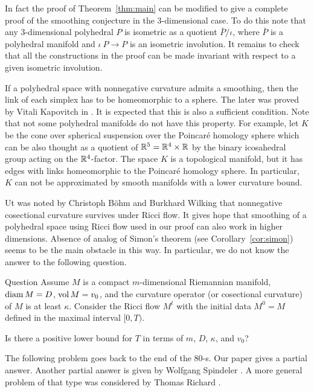 \documentclass[a4paper,10pt]{amsart}
\begin{document}
In fact the proof of Theorem~\ref{thm:main} can be modified to give a complete proof of the smoothing conjecture in the 3-dimensional case.
To do this note that any $3$-dimensional polyhedral $P$
is isometric as a quotient $\bar P/\iota$, where $\bar P$ is a polyhedral manifold and $\iota\:P\to P$ is an isometric involution.
It remains to check that all the constructions in the proof can be made invariant with respect to a given isometric involution.

If a polyhedral space with nonnegative curvature 
admits a smoothing, then the link of each simplex has to be homeomorphic to a sphere.
The later was proved by Vitali Kapovitch in \cite[Theorem 1.3]{kapovitch}.
It is expected that this is also a sufficient condition.
Note that not some polyhedral manifolds do not have this property.
For example, let $K$ be the cone over spherical suspension over the Poincar\'e homology sphere which can be also thought as a
quotient of $\mathbb{R}^5=\mathbb{R}^4\times\mathbb{R}$ by
the binary icosahedral group acting on the $\mathbb{R}^4$-factor.
The space $K$ is a topological manifold, but it has edges  with links homeomorphic to the Poincar\'e homology sphere.
In particular, $K$ can not be approximated by smooth manifolds with a lower curvature bound.

Ut was noted by Christoph B\"ohm and Burkhard Wilking \cite{boehm-wilking} that
nonnegative cosectional curvature survives under Ricci flow.
It gives hope that smoothing of a polyhedral space 
using Ricci flow used in our proof
can also work in higher dimensions.
Absence of analog of Simon's theorem (see Corollary~\ref{cor:simon}) seems to be the main obstacle in this way.
In particular, we do not know the answer to the following question.

\begin{thm}{Question} 
Assume $M$ is a compact $m$-dimensional Riemannian manifold,
$\operatorname{diam} M=D$, $\operatorname{vol} M=v_0$,
and the curvature operator (or cosectional curvature) of $M$ is at least $\kappa$.
Consider the Ricci flow $M^t$ with the initial data $M^0=M$
defined in the maximal interval $[0,T)$.

Is there a positive lower bound for $T$ in terms of $m$, $D$, $\kappa$, and $v_0$? 
\end{thm}


The following problem goes back to the end of the 80-s.
Our paper gives a partial answer.
Another partial answer is given by Wolfgang Spindeler \cite{spindeler}.
A more general problem of that type was considered by Thomas Richard \cite{richard}.
\end{document}
